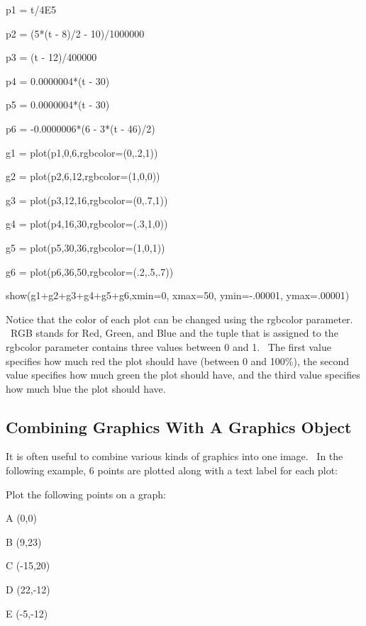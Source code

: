 \documentclass[12pt,twoside]{book}
\begin{document}
p1 = t/4E5

p2 = (5*(t {}- 8)/2 {}- 10)/1000000

p3 = (t {}- 12)/400000

p4 = 0.0000004*(t {}- 30)

p5 = 0.0000004*(t {}- 30)

p6 = {}-0.0000006*(6 {}- 3*(t {}- 46)/2)



g1 = plot(p1,0,6,rgbcolor=(0,.2,1))

g2 = plot(p2,6,12,rgbcolor=(1,0,0))

g3 = plot(p3,12,16,rgbcolor=(0,.7,1))

g4 = plot(p4,16,30,rgbcolor=(.3,1,0))

g5 = plot(p5,30,36,rgbcolor=(1,0,1))

g6 = plot(p6,36,50,rgbcolor=(.2,.5,.7))


\bigskip

show(g1+g2+g3+g4+g5+g6,xmin=0, xmax=50, ymin={}-.00001, ymax=.00001)

{\textbar}


\bigskip

Notice that the color of each plot can be changed using the rgbcolor parameter. \ RGB stands for Red, Green, and Blue and the tuple that is assigned to the rgbcolor parameter contains three values between 0 and 1. \ The first value specifies how much red the plot should have (between 0 and 100\%), the second value specifies how much green the plot should have, and the third value specifies how much blue the plot should have.

\subsection[Combining Graphics With A Graphics Object]{Combining Graphics With A Graphics Object}

It is often useful to combine various kinds of graphics into one image. \ In the following example, 6 points are plotted along with a text label for each plot:

{\textquotedbl}{\textquotedbl}{\textquotedbl}

Plot the following points on a graph:


\bigskip

A (0,0)

B (9,23)

C ({}-15,20)

D (22,{}-12)

E ({}-5,{}-12)
\end{document}

